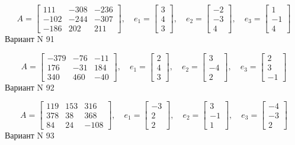 \documentclass[11pt]{report}
\begin{document}
$$A = \left[\begin{matrix}111 & -308 & -236\\-102 & -244 & -307\\-186 & 202 & 211\end{matrix}\right],\quad e_1 = \left[\begin{matrix}3\\4\\3\end{matrix}\right],\quad e_2 = \left[\begin{matrix}-2\\-3\\4\end{matrix}\right],\quad e_3 = \left[\begin{matrix}1\\-1\\4\end{matrix}\right]$$Вариант N 91

$$A = \left[\begin{matrix}-379 & -76 & -11\\176 & -31 & 184\\340 & 460 & -40\end{matrix}\right],\quad e_1 = \left[\begin{matrix}2\\4\\3\end{matrix}\right],\quad e_2 = \left[\begin{matrix}3\\-4\\2\end{matrix}\right],\quad e_3 = \left[\begin{matrix}2\\3\\-1\end{matrix}\right]$$Вариант N 92

$$A = \left[\begin{matrix}119 & 153 & 316\\378 & 38 & 368\\84 & 24 & -108\end{matrix}\right],\quad e_1 = \left[\begin{matrix}-3\\2\\2\end{matrix}\right],\quad e_2 = \left[\begin{matrix}3\\-1\\1\end{matrix}\right],\quad e_3 = \left[\begin{matrix}-4\\-3\\2\end{matrix}\right]$$Вариант N 93
\end{document}

